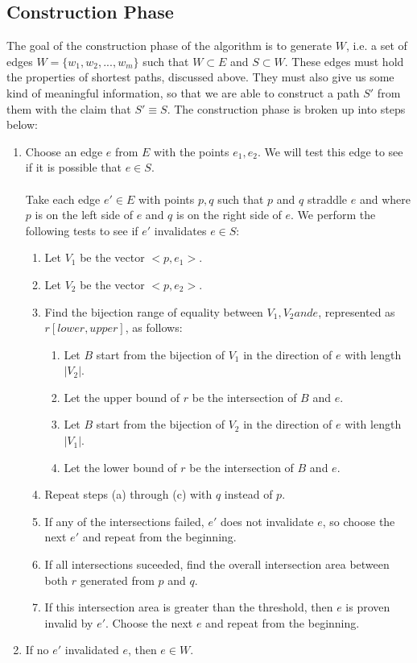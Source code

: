 \documentclass[12pt]{article}
\begin{document}
\subsection{Construction Phase}\label{subsec:construct}
The goal of the construction phase of the algorithm is to generate $W$, i.e. a set of
edges $W = \{w_1, w_2, ..., w_m\}$ such that $W \subset E$ and $S \subset W$.
These edges must hold the properties of shortest paths, discussed above.
They must also give us some kind of meaningful information, so that we are able to
construct a path $S'$ from them with the claim that $S' \equiv S$.
The construction phase is broken up into steps below:
\begin{enumerate}
\item Choose an edge $e$ from $E$ with the points $e_1,e_2$.
We will test this edge to see if it is possible that $e \in S$.
\\\\
Take each edge $e' \in E$ with points $p,q$ such that $p$ and $q$ straddle
$e$ and where $p$ is on the left side
of $e$ and $q$ is on the right side of $e$.
We perform the following tests to see if $e'$ invalidates $e \in S$:
\begin{enumerate}
\item Let $V_1$ be the vector $<p,e_1>$.
\item Let $V_2$ be the vector $<p,e_2>$.
\item Find the bijection range of equality between $V_1,V_2 and e$,
represented as $r[lower, upper]$, as follows:
\begin{enumerate}
\item Let $B$ start from the bijection of $V_1$
in the direction of $e$ with length $|V_2|$.
\item Let the upper bound of $r$ be the intersection of $B$ and $e$.
\item Let $B$ start from the bijection of $V_2$
in the direction of $e$ with length $|V_1|$.
\item Let the lower bound of $r$ be the intersection of $B$ and $e$.
\end{enumerate}
\item Repeat steps (a) through (c) with $q$ instead of $p$.
\item If any of the intersections failed, $e'$ does not invalidate $e$,
so choose the next $e'$ and repeat from the beginning.
\item If all intersections suceeded, find the overall intersection area between
both $r$ generated from $p$ and $q$.
\item If this intersection area is greater than the threshold, then $e$ is proven
invalid by $e'$. Choose the next $e$ and repeat from the beginning.
\end{enumerate}
\item If no $e'$ invalidated $e$, then $e \in W$.
\end{enumerate}
\end{document}
